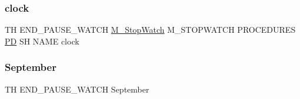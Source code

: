\subsubsection{\texorpdfstring{clock}{clock}}
{\footnotesize\ttfamily TH E\+N\+D\+\_\+\+P\+A\+U\+S\+E\+\_\+\+W\+A\+T\+CH \hyperlink{option__stopwatch_83_8txt_aa2011fc45a5e502e87ee50996a8a9305}{M\+\_\+\+Stop\+Watch} M\+\_\+\+S\+T\+O\+P\+W\+A\+T\+CH P\+R\+O\+C\+E\+D\+U\+R\+ES \hyperlink{what__overview_81_8txt_a85f26da5a4481fbdb0d9c79f2b94de3e}{PD} SH N\+A\+ME clock}

\mbox{\label{end__pause__watch_83_8txt_abe419b6cfb3e18ea312428eb58b25a14}} 
\subsubsection{\texorpdfstring{September}{September}}
{\footnotesize\ttfamily TH E\+N\+D\+\_\+\+P\+A\+U\+S\+E\+\_\+\+W\+A\+T\+CH September}

